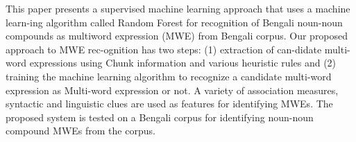 This paper presents a supervised machine learning approach that uses a machine learn-ing algorithm called Random Forest for recognition of Bengali noun-noun
 compounds as multiword expression (MWE) from Bengali corpus. Our proposed
 approach to MWE rec-ognition has two steps: (1) extraction of can-didate
 multi-word expressions using Chunk information and various heuristic rules and
 (2) training the machine learning algorithm to recognize a candidate multi-word
 expression as Multi-word expression or not. A variety of association measures,
 syntactic and linguistic clues are used as features for identifying MWEs. The
 proposed system is tested on a Bengali corpus for identifying noun-noun
 compound MWEs from the corpus.

